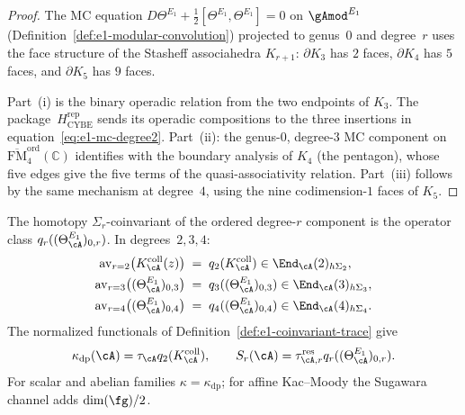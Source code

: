\begin{proof}
The MC equation
$D\Theta^{E_1} + \tfrac{1}{2}[\Theta^{E_1}, \Theta^{E_1}] = 0$
on ${\gAmod}^{E_1}$
(Definition~\ref{def:e1-modular-convolution})
projected to genus~$0$ and degree~$r$ uses the face structure of the
Stasheff associahedra $K_{r+1}$:
$\partial K_3$ has $2$ faces,
$\partial K_4$ has $5$ faces, and
$\partial K_5$ has $9$ faces.

Part~(i) is the binary operadic relation from the two endpoints of
$K_3$.  The package~$H_{\mathrm{CYBE}}^{\mathrm{rep}}$ sends its
operadic compositions to the three insertions in
equation~\eqref{eq:e1-mc-degree2}.  Part~(ii): the genus-$0$,
degree-$3$ MC component on
$\overline{\mathrm{FM}}_4^{\mathrm{ord}}(\mathbb{C})$ identifies
with the boundary analysis of $K_4$ (the pentagon), whose five
edges give the five terms of the quasi-associativity relation.
Part~(iii) follows by the same mechanism at degree~$4$,
using the nine codimension-$1$ faces of $K_5$.
\end{proof}

\begin{theorem}
\label{thm:e1-coinvariant-shadow}
The homotopy $\Sigma_r$-coinvariant of the ordered degree-$r$
component is the operator class
$q_r((\Theta_\cA^{E_1})_{0,r})$.  In degrees~$2,3,4$\textup{:}
\begin{align}
\label{eq:e1-coinvariant-degree2}
\operatorname{av}_{r=2}\bigl(K_\cA^{\mathrm{coll}}(z)\bigr)
&\;=\;q_2(K_\cA^{\mathrm{coll}})
\in\End_\cA(2)_{h\Sigma_2}, \\
\label{eq:e1-coinvariant-degree3}
\operatorname{av}_{r=3}\bigl((\Theta_\cA^{E_1})_{0,3}\bigr)
&\;=\;q_3((\Theta_\cA^{E_1})_{0,3})
\in\End_\cA(3)_{h\Sigma_3}, \\
\label{eq:e1-coinvariant-degree4}
\operatorname{av}_{r=4}\bigl((\Theta_\cA^{E_1})_{0,4}\bigr)
&\;=\;q_4((\Theta_\cA^{E_1})_{0,4})
\in\End_\cA(4)_{h\Sigma_4}.
\end{align}
The normalized functionals of
Definition~\ref{def:e1-coinvariant-trace} give
\[
 \kappa_{\mathrm{dp}}(\cA)
 =\tau_\cA q_2(K_\cA^{\mathrm{coll}}),
 \qquad
 S_r(\cA)=\tau_{\cA,r}^{\mathrm{res}}
 q_r((\Theta_\cA^{E_1})_{0,r}).
\]
For scalar and abelian families $\kappa=\kappa_{\mathrm{dp}}$; for
affine Kac--Moody the Sugawara channel adds $\dim(\fg)/2$.
\end{theorem}

